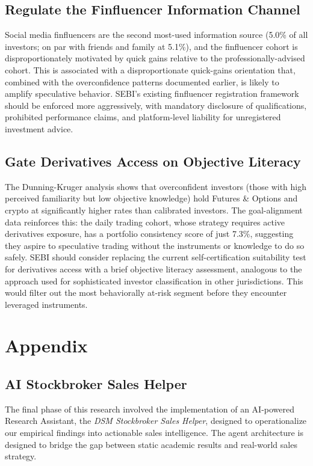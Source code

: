 \documentclass[conference]{IEEEtran}
\begin{document}
\subsection{Regulate the Finfluencer Information Channel}
Social media finfluencers are the second most-used information source (5.0\% of all investors; on par with friends and family at 5.1\%), and the finfluencer cohort is disproportionately motivated by quick gains relative to the professionally-advised cohort. This is associated with a disproportionate quick-gains orientation that, combined with the overconfidence patterns documented earlier, is likely to amplify speculative behavior. SEBI's existing finfluencer registration framework should be enforced more aggressively, with mandatory disclosure of qualifications, prohibited performance claims, and platform-level liability for unregistered investment advice.

\subsection{Gate Derivatives Access on Objective Literacy}
The Dunning-Kruger analysis shows that overconfident investors (those with high perceived familiarity but low objective knowledge) hold Futures \& Options and crypto at significantly higher rates than calibrated investors. The goal-alignment data reinforces this: the daily trading cohort, whose strategy requires active derivatives exposure, has a portfolio consistency score of just 7.3\%, suggesting they aspire to speculative trading without the instruments or knowledge to do so safely. SEBI should consider replacing the current self-certification suitability test for derivatives access with a brief objective literacy assessment, analogous to the approach used for sophisticated investor classification in other jurisdictions. This would filter out the most behaviorally at-risk segment before they encounter leveraged instruments.

\section{Appendix}

\subsection{AI Stockbroker Sales Helper}
The final phase of this research involved the implementation of an AI-powered Research Assistant, the \textit{DSM Stockbroker Sales Helper}, designed to operationalize our empirical findings into actionable sales intelligence. The agent architecture is designed to bridge the gap between static academic results and real-world sales strategy.
\end{document}

